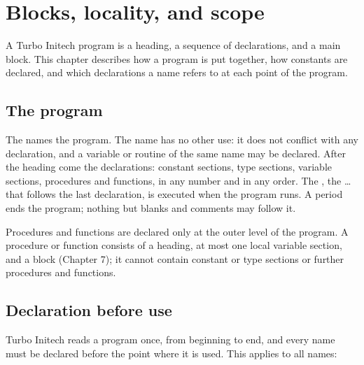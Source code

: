 \chapter{Blocks, locality, and scope}

A Turbo Initech program is a heading, a sequence of declarations, and a
main block.  This chapter describes how a program is put together, how
constants are declared, and which declarations a name refers to at each
point of the program.

\section{The program}

The  names the program.  The name has no other use:
it does not conflict with any declaration, and a variable or routine of the
same name may be declared.  After the heading come the
declarations: constant sections, type sections, variable sections,
procedures and functions, in any number and in any order.  The
, the  \dots{}  that follows the last
declaration, is executed when the program runs.  A period ends the program;
nothing but blanks and comments may follow it.

Procedures and functions are
declared only at the outer level of the program.  A procedure or function
consists of a heading, at most one local variable section, and a block
(Chapter 7); it cannot contain constant or type sections or further
procedures and functions.

\section{Declaration before use}
Turbo Initech reads a program once, from beginning to end, and every name
must be declared before the point where it is used.  This applies to all
names:

